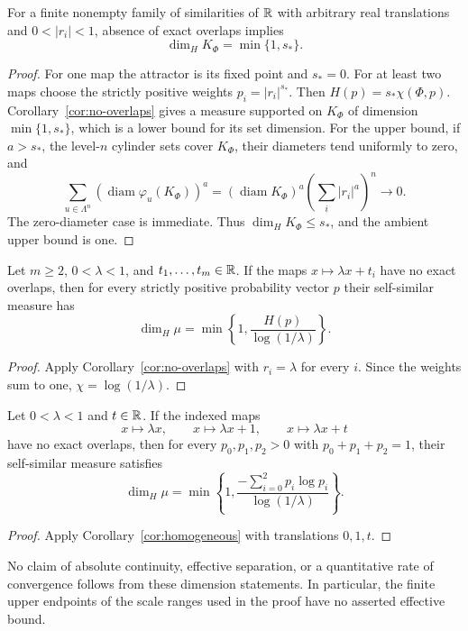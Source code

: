 \begin{corollary}\label{cor:set}
For a finite nonempty family of similarities of $\mathbb R$ with arbitrary real
translations and $0<|r_i|<1$, absence of exact overlaps implies
\[
 \dim_H K_\Phi=\min\{1,s_*\}.
\]
\end{corollary}
\begin{proof}
For one map the attractor is its fixed point and $s_*=0$.
For at least two maps choose the strictly positive weights
$p_i=|r_i|^{s_*}$. Then $H(p)=s_*\chi(\Phi,p)$.
Corollary~\ref{cor:no-overlaps} gives a measure supported on $K_\Phi$ of
dimension $\min\{1,s_*\}$, which is a lower bound for its set dimension.
For the upper bound, if $a>s_*$, the level-$n$ cylinder sets cover
$K_\Phi$, their diameters tend uniformly to zero, and
\[
 \sum_{u\in\Lambda^n}(\operatorname{diam}\varphi_u(K_\Phi))^a
 = (\operatorname{diam}K_\Phi)^a
   \left(\sum_i|r_i|^a\right)^n\longrightarrow0.
\]
The zero-diameter case is immediate. Thus $\dim_H K_\Phi\le s_*$,
and the ambient upper bound is one.
\end{proof}

\begin{corollary}\label{cor:homogeneous}
Let $m\ge2$, $0<\lambda<1$, and $t_1,\ldots,t_m\in\mathbb R$.
If the maps $x\mapsto\lambda x+t_i$ have no exact overlaps, then for
every strictly positive probability vector $p$ their self-similar measure has
\[
 \dim_H\mu=\min\left\{1,\frac{H(p)}{\log(1/\lambda)}\right\}.
\]
\end{corollary}
\begin{proof}
Apply Corollary~\ref{cor:no-overlaps} with $r_i=\lambda$ for every $i$.
Since the weights sum to one, $\chi=\log(1/\lambda)$.
\end{proof}

\begin{corollary}\label{cor:three-maps}
Let $0<\lambda<1$ and $t\in\mathbb R$.  If the indexed maps
\[
 x\longmapsto\lambda x,\qquad
 x\longmapsto\lambda x+1,\qquad
 x\longmapsto\lambda x+t
\]
have no exact overlaps, then for every $p_0,p_1,p_2>0$ with
$p_0+p_1+p_2=1$, their self-similar measure satisfies
\[
 \dim_H\mu
 =\min\left\{1,\frac{-\sum_{i=0}^2 p_i\log p_i}
                         {\log(1/\lambda)}\right\}.
\]
\end{corollary}
\begin{proof}
Apply Corollary~\ref{cor:homogeneous} with translations $0,1,t$.
\end{proof}

No claim of absolute continuity, effective separation, or a quantitative rate
of convergence follows from these dimension statements. In particular, the
finite upper endpoints of the scale ranges used in the proof have no asserted
effective bound.
